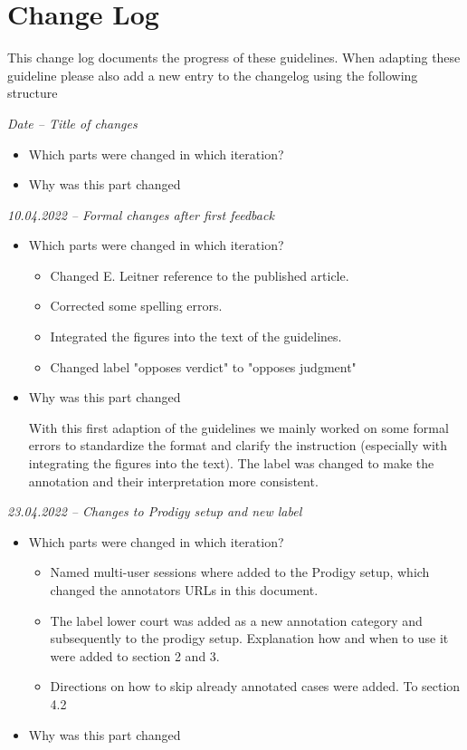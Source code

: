 \documentclass{article}
\begin{document}
\section{Change Log}
This change log documents the progress of these guidelines. When adapting these guideline please also add a new entry to the changelog using the following structure
\begin{mdframed}[frametitle={Template}]
\emph{Date – Title of changes}
\begin{itemize}
	\item Which parts were changed in which iteration?
    \item Why was this part changed
\end{itemize}
\end{mdframed}
\begin{mdframed}[frametitle={Change log}]
\emph{10.04.2022 – Formal changes after first feedback}
\begin{itemize}
	\item Which parts were changed in which iteration? 
	\begin{itemize}
	    \item Changed E. Leitner reference to the published article.
	    \item Corrected some spelling errors.
	    \item Integrated the figures into the text of the guidelines.
	    \item Changed label "opposes verdict" to "opposes judgment"
	\end{itemize} 
    \item Why was this part changed
    
    With this first adaption of the guidelines we mainly worked on some formal errors to standardize the format and clarify the instruction (especially with integrating the figures into the text). The label was changed to make the annotation and their interpretation more consistent.

\end{itemize}
\emph{23.04.2022 – Changes to Prodigy setup and new label}
\begin{itemize}
	\item Which parts were changed in which iteration? 
	\begin{itemize}
	    \item Named multi-user sessions where added to the Prodigy setup, which changed the annotators URLs in this document.
	    \item The label lower court was added as a new annotation category and subsequently to the prodigy setup. Explanation how and when to use it were added to section 2 and 3.
	    \item Directions on how to skip already annotated cases were added. To section 4.2
	\end{itemize} 
    \item Why was this part changed
    

\end{itemize}
\end{mdframed}
\end{document}
